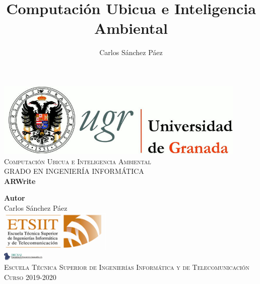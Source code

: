 \documentclass[12pt,spanish]{article}
\title{Computación Ubicua e Inteligencia Ambiental}
\author{Carlos Sánchez Páez}
\begin{document}
\lstset{columns=fullflexible,basicstyle=\ttfamily}


\begin{titlepage}

 \newlength{\centeroffset}
 \setlength{\centeroffset}{-0.5\oddsidemargin}
 \addtolength{\centeroffset}{0.5\evensidemargin}
 \thispagestyle{empty}

 \noindent\hspace*{\centeroffset}
 \begin{minipage}{\textwidth}

  \centering
  \includegraphics[width=0.9\textwidth]{logo_ugr.jpg}\\[1.4cm]

  \textsc{ \Large Computación Ubicua e Inteligencia Ambiental\\[0.2cm]}
  \textsc{GRADO EN INGENIERÍA INFORMÁTICA}\\[1cm]

  {\Huge\bfseries ARWrite \\}
 \end{minipage}

 \vspace{1.5cm}
 \noindent\hspace*{\centeroffset}
 \begin{minipage}{\textwidth}
  \centering

  \textbf{Autor}\\ {Carlos Sánchez Páez}\\[2.5ex]
  \includegraphics[width=0.4\textwidth]{etsiit_logo.png}\\[0.1cm]
  \vspace{1.5cm}
  \includegraphics[width=0.15\textwidth]{decsai.jpg}\\[0.1cm]
  \vspace{1cm}
  \textsc{Escuela Técnica Superior de Ingenierías Informática y de Telecomunicación}\\
  \vspace{1cm}
  \textsc{Curso 2019-2020}
 \end{minipage}
\end{titlepage}
\thispagestyle{empty}
\newpage
\tableofcontents{}
\newpage
\end{document}
